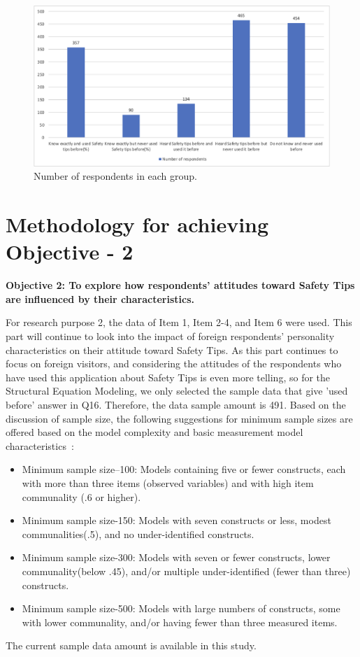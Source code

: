 \begin{figure}[h]
  \includegraphics[width=\linewidth]{Figure/Figure6.jpg}
  \centering
  \caption{Number of respondents in each group. }
  \label{fig6}
\end{figure}




\section{Methodology for achieving Objective - 2 }
\textbf{Objective 2: To explore how respondents' attitudes toward Safety Tips are influenced by their characteristics. }

For research purpose 2, the data of Item 1, Item 2-4, and Item 6 were used. This part will continue to look into the impact of foreign respondents' personality characteristics on their attitude toward Safety Tips. As this part continues to focus on foreign visitors, and considering the attitudes of the respondents who have used this application about Safety Tips is even more telling, so for the Structural Equation Modeling, we only selected the sample data that give 'used before' answer in Q16. Therefore, the data sample amount is 491. Based on the discussion of sample size, the following suggestions for minimum sample sizes are offered based on the model complexity and basic measurement model characteristics~\cite{ref15}:

\begin{itemize}
\item Minimum sample size--100: Models containing five or fewer constructs, each with more than three items (observed variables) and with high item communality (.6 or higher).
\item Minimum sample size-150: Models with seven constructs or less, modest communalities(.5), and no under-identified constructs.
\item Minimum sample size-300: Models with seven or fewer constructs, lower communality(below .45), and/or multiple under-identified (fewer than three) constructs.
\item Minimum sample size-500: Models with large numbers of constructs, some with lower communality, and/or having fewer than three measured items.
\end{itemize}
The current sample data amount is available in this study. 

